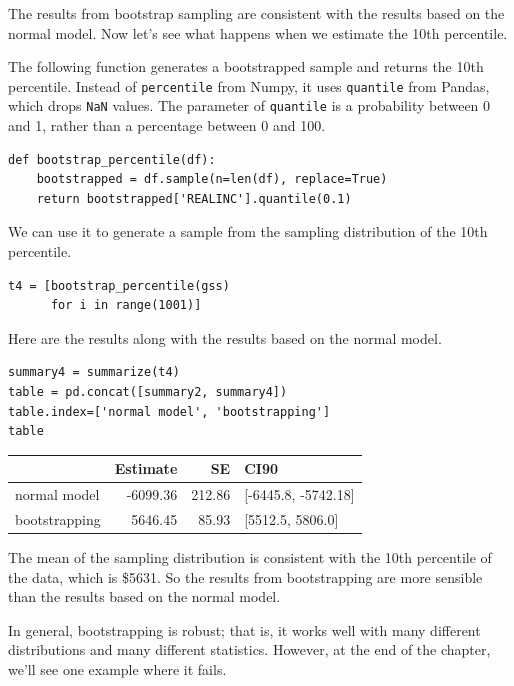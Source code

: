 The results from bootstrap sampling are consistent with the results
based on the normal model. Now let's see what happens when we estimate
the 10th percentile.

The following function generates a bootstrapped sample and returns the
10th percentile. Instead of \passthrough{\lstinline!percentile!} from
Numpy, it uses \passthrough{\lstinline!quantile!} from Pandas, which
drops \passthrough{\lstinline!NaN!} values. The parameter of
\passthrough{\lstinline!quantile!} is a probability between 0 and 1,
rather than a percentage between 0 and 100.

\begin{lstlisting}[]
def bootstrap_percentile(df):
    bootstrapped = df.sample(n=len(df), replace=True)
    return bootstrapped['REALINC'].quantile(0.1)
\end{lstlisting}

We can use it to generate a sample from the sampling distribution of the
10th percentile.

\begin{lstlisting}[]
t4 = [bootstrap_percentile(gss)
      for i in range(1001)]
\end{lstlisting}

Here are the results along with the results based on the normal model.

\begin{lstlisting}[]
summary4 = summarize(t4)
table = pd.concat([summary2, summary4])
table.index=['normal model', 'bootstrapping']
table
\end{lstlisting}

\begin{tabular}{lrrl}
\midrule
{} &  Estimate &      SE &                 CI90 \\
\midrule
normal model  &  -6099.36 &  212.86 &  [-6445.8, -5742.18] \\
bootstrapping &   5646.45 &   85.93 &     [5512.5, 5806.0] \\
\midrule
\end{tabular}

The mean of the sampling distribution is consistent with the 10th
percentile of the data, which is \$5631. So the results from
bootstrapping are more sensible than the results based on the normal
model.

In general, bootstrapping is robust; that is, it works well with many
different distributions and many different statistics. However, at the
end of the chapter, we'll see one example where it fails.

